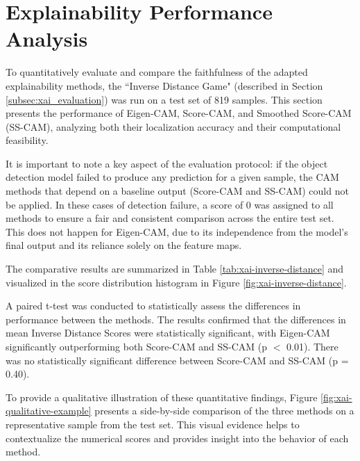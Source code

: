 \section{Explainability Performance Analysis}

To quantitatively evaluate and compare the faithfulness of the adapted explainability methods, the ``Inverse Distance Game" (described in Section \ref{subsec:xai_evaluation}) was run on a test set of 819 samples. This section presents the performance of Eigen-CAM, Score-CAM, and Smoothed Score-CAM (SS-CAM), analyzing both their localization accuracy and their computational feasibility.

It is important to note a key aspect of the evaluation protocol: if the object detection model failed to produce any prediction for a given sample, the CAM methods that depend on a baseline output (Score-CAM and SS-CAM) could not be applied. In these cases of detection failure, a score of 0 was assigned to all methods to ensure a fair and consistent comparison across the entire test set. This does not happen for Eigen-CAM, due to its independence from the model's final output and its reliance solely on the feature maps.

The comparative results are summarized in Table \ref{tab:xai-inverse-distance} and visualized in the score distribution histogram in Figure \ref{fig:xai-inverse-distance}.





A paired t-test was conducted to statistically assess the differences in performance between the methods. The results confirmed that the differences in mean Inverse Distance Scores were statistically significant, with Eigen-CAM significantly outperforming both Score-CAM and SS-CAM (p $<$ 0.01). There was no statistically significant difference between Score-CAM and SS-CAM (p = 0.40).

To provide a qualitative illustration of these quantitative findings, Figure \ref{fig:xai-qualitative-example} presents a side-by-side comparison of the three methods on a representative sample from the test set. This visual evidence helps to contextualize the numerical scores and provides insight into the behavior of each method.


